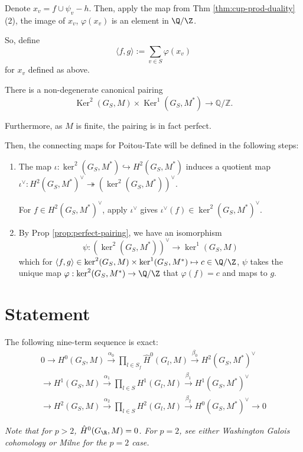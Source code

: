 \documentclass[11pt]{article}
\begin{document}
Denote $x_v = f \cup \psi_v - h$. Then, apply the map from Thm \ref{thm:cup-prod-duality} (2), the image of $x_v$, $\varphi(x_v)$ is an element in $\Q/\Z$.

\bigskip
So, define
\[
\langle f, g \rangle := \sum_{v \in S} \varphi(x_v)
\]
for $x_v$ defined as above.

\begin{prop} \label{prop:perfect-pairing}
    There is a non-degenerate canonical pairing
    \[ \operatorname{Ker}^2(G_S,M)\times \operatorname{Ker}^1(G_S,M^*)\to \mathbb{Q}/\mathbb{Z}. \]

    \bigskip
    Furthermore, as $M$ is finite, the pairing is in fact perfect.
\end{prop}


\bigskip
Then, the connecting maps for Poitou-Tate will be defined in the following steps:
\begin{enumerate}
    \item The map $\iota: \ker^2 (G_S, M^*) \hookrightarrow H^2 (G_S, M^*)$ induces a quotient map $\iota^\vee: H^2 (G_S, M^*)^\vee \twoheadrightarrow (\ker^2 (G_S, M^*))^\vee.$

    \bigskip
    For $f \in H^2 (G_S, M^*)^\vee$, apply $\iota^\vee$ gives $\iota^\vee (f) \in \ker^2 (G_S, M^*)^\vee$.

    \item By Prop \ref{prop:perfect-pairing}, we have an isomorphism
    \[
    \psi: (\ker^2 (G_S, M^*))^\vee \to \ker^1 (G_S, M)
    \]
    which for $\langle f, g \rangle \in \ker^2 (G_S, M) \times \ker^1 (G_S, M^*) \mapsto c \in \Q/\Z$, $\psi$ takes the unique map $\varphi: \ker^2 (G_S, M^*) \to \Q/\Z$ that $\varphi(f) = c$ and maps to $g$.
\end{enumerate}




\section{Statement}
\begin{thm}
The following nine-term sequence is exact:
\begin{align*}
0 \to  H^0 (G_S, M) \xrightarrow{\alpha_0} \prod_{l \in S_f} \hat{H}^0 (G_l, M) \xrightarrow{\beta_0} H^2 (G_{S}, M^*)^\vee \\
\to  H^1 (G_S, M) \xrightarrow{\alpha_1} \prod_{l \in S} H^1 (G_l, M) \xrightarrow{\beta_1} H^1 (G_S, M^*)^\vee \\
\to H^2 (G_S, M) \xrightarrow{\alpha_2} \prod_{l \in S} H^2 (G_l, M) \xrightarrow{\beta_2} H^0 (G_S, M^*)^\vee \to 0
\end{align*}

\bigskip
\textit{Note that for $p >2$, $\hat{H}^0 (G_{\R}, M) = 0$. For $p = 2$, see either Washington Galois cohomology or Milne for the $p = 2$ case. }
\end{thm}
\end{document}
